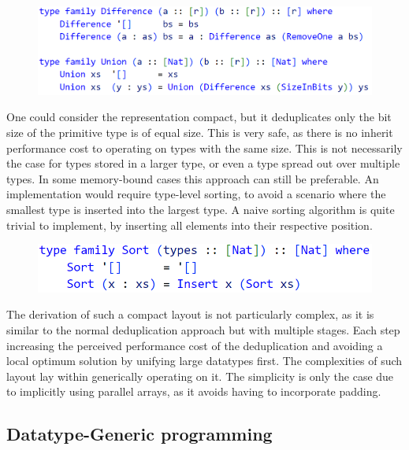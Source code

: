 \documentclass{article}
\begin{document}
\begin{figure}[hbt!]
    \hspace{1em}
    \includegraphics[scale=0.42]{CodeType12.png}
\end{figure}

One could consider the representation compact, but it deduplicates only the bit size of the primitive type is of equal size.
This is very safe, as there is no inherit performance cost to operating on types with the same size.
This is not necessarily the case for types stored in a larger type, or even a type spread out over multiple types.
In some memory-bound cases this approach can still be preferable.
An implementation would require type-level sorting, to avoid a scenario where the smallest type is inserted into the largest type.
A naive sorting algorithm is quite trivial to implement, by inserting all elements into their respective position. 

\begin{figure}[hbt!]
    \hspace{1em}
    \includegraphics[scale=0.42]{CodeType13.png}
\end{figure}

The derivation of such a compact layout is not particularly complex, as it is similar to the normal deduplication approach but with multiple stages.
Each step increasing the perceived performance cost of the deduplication and avoiding a local optimum solution by unifying large datatypes first. 
The complexities of such layout lay within generically operating on it.
The simplicity is only the case due to implicitly using parallel arrays, as it avoids having to incorporate padding.

\newpage

\subsection{Datatype-Generic programming}
\end{document}
